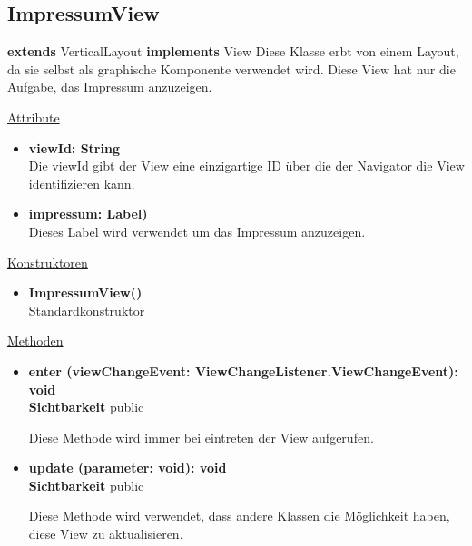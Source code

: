 \newpage
\subsection{ImpressumView}
\textbf{extends}  VerticalLayout \newline
\textbf{implements} View \newline
Diese Klasse erbt von einem Layout, da sie selbst als graphische Komponente verwendet wird. Diese View hat nur die Aufgabe, das Impressum anzuzeigen.
\newline

\underline{Attribute}
\begin{itemize}
\itemsep0pt
\item \textbf{viewId: String} \hfill\\ 
Die viewId gibt der View eine einzigartige ID über die der Navigator die View identifizieren kann.

\item \textbf{impressum: Label)} \hfill\\ 
Dieses Label wird verwendet um das Impressum anzuzeigen.

\end{itemize}

\underline{Konstruktoren}
\begin{itemize}
\itemsep0pt
\item \textbf{ImpressumView()} \hfill\\
Standardkonstruktor
\end{itemize}

\underline{Methoden}
\begin{itemize}
\itemsep0pt
\item \textbf{enter (viewChangeEvent: ViewChangeListener.ViewChangeEvent): void}\hfill\\
\textbf{Sichtbarkeit} public

Diese Methode wird immer bei eintreten der View aufgerufen.

\item \textbf{update (parameter: void): void}\hfill\\
\textbf{Sichtbarkeit} public

Diese Methode wird verwendet, dass andere Klassen die Möglichkeit haben, diese View zu aktualisieren.

\end{itemize}
